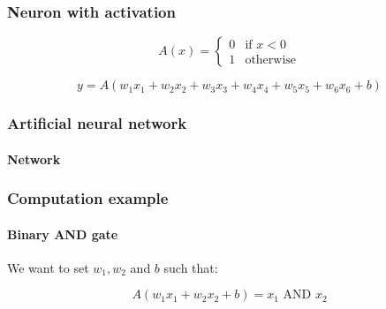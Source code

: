 \documentclass[10pt]{beamer}
\begin{document}
\begin{frame}
  \frametitle{Neuron with activation}

  \begin{center}
    \scalebox{0.6}{
      
    }
  \end{center}

  \[
  A(x) = \begin{cases}
    0 & \text{if } x < 0 \\
    1 & \text{otherwise}
  \end{cases}
  \]

  \[
  y = A(w_{1}x_{1} + w_{2}x_{2} + w_{3}x_{3} + w_{4}x_{4} + w_{5}x_{5} + w_{6}x_{6} + b)
  \]
\end{frame}

\begin{frame}
  \frametitle{Artificial neural network}

  \framesubtitle{Network}

  \begin{center}
    \scalebox{0.7}{
      
    }
  \end{center}
\end{frame}

\begin{frame}
  \frametitle{Computation example}

  \framesubtitle{Binary AND gate}

  \begin{center}
    \scalebox{1}{
      
    }
  \end{center}

  We want to set $w_{1}, w_{2}$ and $b$ such that:

  \[
  A(w_{1}x_{1} + w_{2}x_{2} + b) = x_{1} \text{ AND } x_{2}
  \]


\end{frame}
\end{document}
